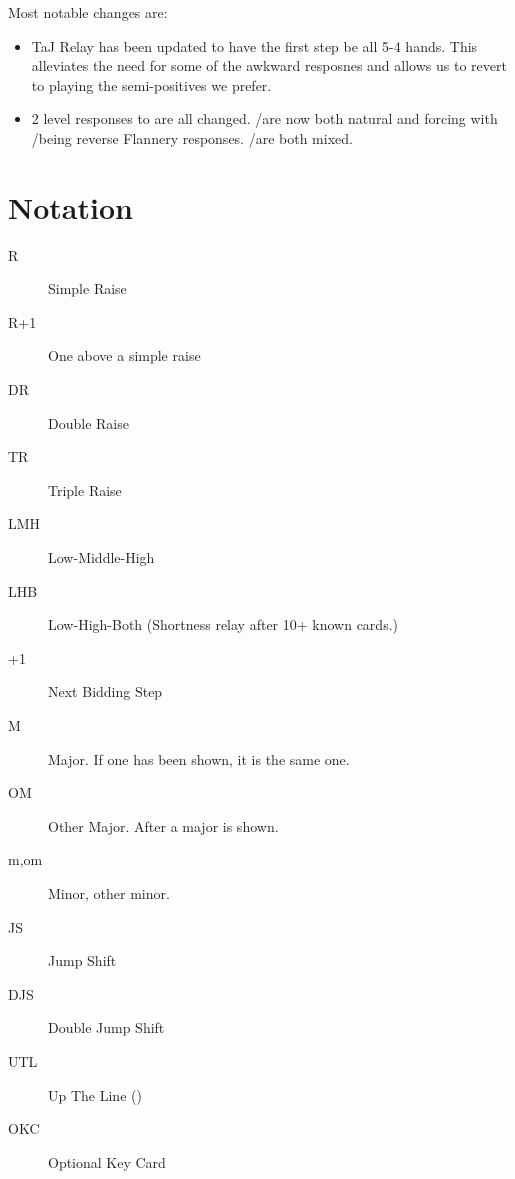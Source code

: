 \documentclass[tom-jenni]{subfile}
\begin{document}
Most notable changes are:

\begin{itemize}
	\item TaJ Relay has been updated to have the first step be all 5-4 hands.  This alleviates the need for some of the awkward  resposnes and allows us to revert to playing the semi-positives we prefer.
	\item 2 level responses to  are all changed.  /\ddd are now both natural and forcing with /\sss being reverse Flannery responses. /\ddd are both mixed.
\end{itemize}

\section{Notation}

\begin{description}
	\item[R] Simple Raise
	\item[R+1] One above a simple raise
	\item[DR] Double Raise
	\item[TR] Triple Raise
	\item[LMH] Low-Middle-High
	\item[LHB] Low-High-Both (Shortness relay after 10+ known cards.)
	\item[+1] Next Bidding Step
	\item[M] Major.  If one has been shown, it is the same one.
	\item[OM] Other Major.  After a major is shown.
	\item[m,om] Minor, other minor.
	\item[JS] Jump Shift
	\item[DJS] Double Jump Shift
	\item[UTL] Up The Line (\ccc\ddd\hhh\sss)
	\item[OKC] Optional Key Card
\end{description}
\end{document}
